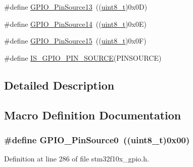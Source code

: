 \begin{DoxyCompactItemize}
\item 
\#define \hyperlink{group___g_p_i_o___pin__sources_gace4beb385facd306324fa9e362df5fda}{G\+P\+I\+O\+\_\+\+Pin\+Source13}~((\hyperlink{_p_e___types_8h_aba7bc1797add20fe3efdf37ced1182c5}{uint8\+\_\+t})0x0\+D)
\item 
\#define \hyperlink{group___g_p_i_o___pin__sources_ga5fbb540a86af4015a46ac16c61ddb1f7}{G\+P\+I\+O\+\_\+\+Pin\+Source14}~((\hyperlink{_p_e___types_8h_aba7bc1797add20fe3efdf37ced1182c5}{uint8\+\_\+t})0x0\+E)
\item 
\#define \hyperlink{group___g_p_i_o___pin__sources_ga9b29d9a9ecb1579ecedf4ea53ccbfd5b}{G\+P\+I\+O\+\_\+\+Pin\+Source15}~((\hyperlink{_p_e___types_8h_aba7bc1797add20fe3efdf37ced1182c5}{uint8\+\_\+t})0x0\+F)
\item 
\#define \hyperlink{group___g_p_i_o___pin__sources_ga689e4e72591136b6a8d4df9d895181f7}{I\+S\+\_\+\+G\+P\+I\+O\+\_\+\+P\+I\+N\+\_\+\+S\+O\+U\+R\+CE}(P\+I\+N\+S\+O\+U\+R\+CE)
\end{DoxyCompactItemize}


\subsection{Detailed Description}


\subsection{Macro Definition Documentation}
\subsubsection[{\texorpdfstring{G\+P\+I\+O\+\_\+\+Pin\+Source0}{GPIO_PinSource0}}]{\setlength{\rightskip}{0pt plus 5cm}\#define G\+P\+I\+O\+\_\+\+Pin\+Source0~(({\bf uint8\+\_\+t})0x00)}\hypertarget{group___g_p_i_o___pin__sources_ga028bcbdf5a7fd81ec45830f60a022bb4}{}\label{group___g_p_i_o___pin__sources_ga028bcbdf5a7fd81ec45830f60a022bb4}


Definition at line 286 of file stm32f10x\+\_\+gpio.\+h.

